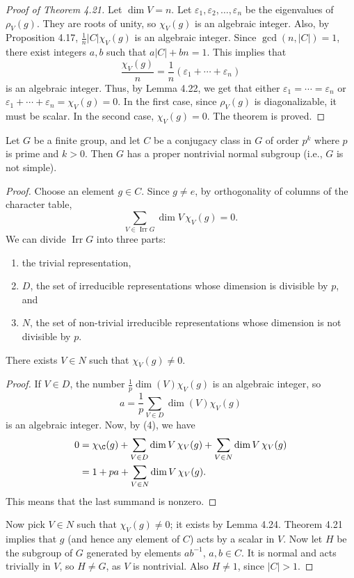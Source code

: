 \begin{proof}[Proof of Theorem 4.21]
Let $\dim V=n$. Let $\varepsilon_1,\varepsilon_2,\ldots,\varepsilon_n$ be the eigenvalues of $\rho_V(g)$. They are roots of unity, so $\chi_V(g)$ is an algebraic integer. Also, by Proposition 4.17, $\frac1n|C|\chi_V(g)$ is an algebraic integer. Since $\gcd(n,|C|)=1$, there exist integers $a,b$ such that $a|C|+bn=1$. This implies that
\[
\frac{\chi_V(g)}n=\frac1n(\varepsilon_1+\cdots+\varepsilon_n)
\]
is an algebraic integer. Thus, by Lemma 4.22, we get that either $\varepsilon_1=\cdots=\varepsilon_n$ or $\varepsilon_1+\cdots+\varepsilon_n=\chi_V(g)=0$. In the first case, since $\rho_V(g)$ is diagonalizable, it must be scalar. In the second case, $\chi_V(g)=0$. The theorem is proved.
\end{proof}
\begin{theorem}[4.23]
Let $G$ be a finite group, and let $C$ be a conjugacy class in $G$ of order $p^k$ where $p$ is prime and $k>0$. Then $G$ has a proper nontrivial normal subgroup (i.e., $G$ is not simple).
\end{theorem}
\begin{proof}
Choose an element $g\in C$. Since $g\ne e$, by orthogonality of columns of the character table,
\[
\sum_{V\in\operatorname{Irr}G}\dim V\,\chi_V(g)=0.\tag{4}
\]
We can divide $\operatorname{Irr}G$ into three parts:
\begin{enumerate}
\item the trivial representation,
\item $D$, the set of irreducible representations whose dimension is divisible by $p$, and
\item $N$, the set of non-trivial irreducible representations whose dimension is not divisible by $p$.
\end{enumerate}
\begin{lemma}[4.24]
There exists $V\in N$ such that $\chi_V(g)\ne0$.
\end{lemma}
\begin{proof}
If $V\in D$, the number $\frac1p\dim(V)\chi_V(g)$ is an algebraic integer, so
\[
a=\frac1p\sum_{V\in D}\dim(V)\chi_V(g)
\]
is an algebraic integer. Now, by (4), we have
\[
\begin{aligned}
0&=\chi_{\C}(g)+\sum_{V\in D}\dim V\,\chi_V(g)+\sum_{V\in N}\dim V\,\chi_V(g)\\
 &=1+pa+\sum_{V\in N}\dim V\,\chi_V(g).
\end{aligned}
\]
This means that the last summand is nonzero.
\end{proof}
Now pick $V\in N$ such that $\chi_V(g)\ne0$; it exists by Lemma 4.24. Theorem 4.21 implies that $g$ (and hence any element of $C$) acts by a scalar in $V$. Now let $H$ be the subgroup of $G$ generated by elements $ab^{-1}$, $a,b\in C$. It is normal and acts trivially in $V$, so $H\ne G$, as $V$ is nontrivial. Also $H\ne1$, since $|C|>1$.
\end{proof}
